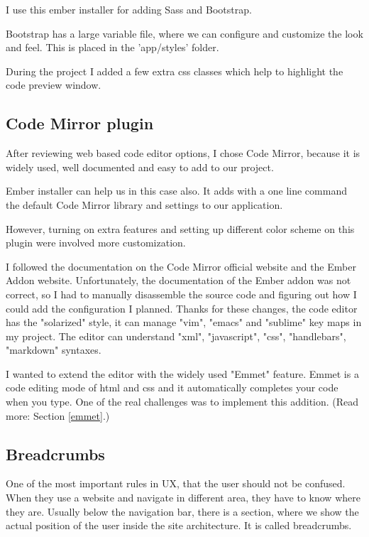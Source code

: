 \documentclass[12pt, a4paper, oneside, openright, medskipamount]{report}
\begin{document}
I use this ember installer for adding Sass and Bootstrap.

Bootstrap has a large variable file, where we can configure and customize the look and feel. This is placed in the 'app/styles' folder.

During the project I added a few extra css classes which help to highlight the code preview window.

\subsection{Code Mirror plugin}

After reviewing web based code editor options, I chose Code Mirror, because it is widely used, well documented and easy to add to our project.

Ember installer can help us in this case also. It adds with a one line command the default Code Mirror library and settings to our application.

However, turning on extra features and setting up different color scheme on this plugin were involved more customization.

I followed the documentation on the Code Mirror official website and the Ember Addon website. Unfortunately, the documentation of the Ember addon was not correct, so I had to manually disassemble the source code and figuring out how I could add the configuration I planned. Thanks for these changes, the code editor has the "solarized" style, it can manage "vim", "emacs" and "sublime" key maps in my project. The editor can understand "xml", "javascript", "css", "handlebars", "markdown" syntaxes.

I wanted to extend the editor with the widely used "Emmet" feature. Emmet is a code editing mode of html and css and it automatically completes your code when you type. One of the real challenges was to implement this addition. (Read more: Section \ref{emmet}.)

\subsection{Breadcrumbs}

One of the most important rules in UX, that the user should not be confused. When they use a website and navigate in different area, they have to know where they are. Usually below the navigation bar, there is a section, where we show the actual position of the user inside the site architecture. It is called breadcrumbs.
\end{document}
